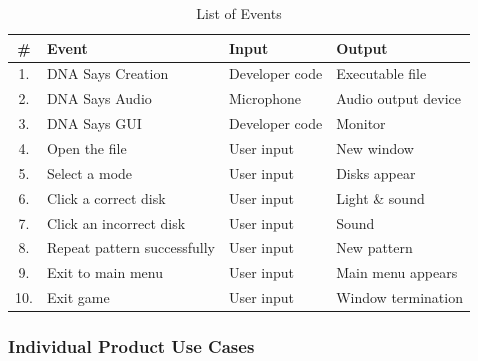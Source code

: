 \documentclass[12pt, titlepage]{article}
\begin{document}
	\begin{table}[H]
		\centering
		\caption{List of Events}
		\label{tab:table2}
		\begin{tabular}{clll}
			\hline
			\# & Event & Input & Output\\
			\hline
			1. & DNA Says Creation & Developer code & Executable file\\
			2. & DNA Says Audio & Microphone & Audio output device\\
			3. & DNA Says GUI & Developer code & Monitor\\
			4. & Open the file & User input & New window\\
			5. & Select a mode & User input & Disks appear\\
			6. & Click a correct disk & User input & Light \& sound\\
			7. & Click an incorrect disk & User input & Sound\\
			8. & Repeat pattern successfully & User input & New pattern\\
			9. & Exit to main menu & User input & Main menu appears\\
			10. & Exit game & User input & Window termination\\
			\hline
		\end{tabular}
	\end{table}
	
\subsubsection{Individual Product Use Cases}
\end{document}
